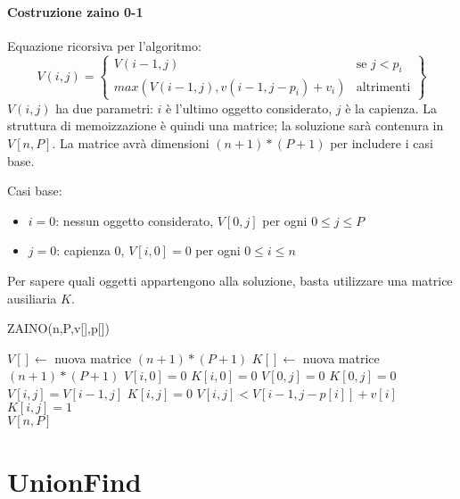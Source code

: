 \documentclass[11pt]{book}
\begin{document}
\subsubsection{Costruzione zaino 0-1}
Equazione ricorsiva per l'algoritmo:
\begin{equation*}
    V(i,j)=
    \left\{
        \begin{array}{lr}
            V(i-1,j)&\text{se } j<p_i\\
            max(V(i-1,j), v(i-1,j-p_i)+v_i)&\text{altrimenti}
        \end{array}
    \right\}
\end{equation*}
$V(i,j)$ ha due parametri: $i$ è l'ultimo oggetto considerato, $j$ è la capienza. La struttura di memoizzazione è quindi 
una matrice; la soluzione sarà contenura in $V[n,P]$. La matrice avrà dimensioni $(n+1)*(P+1)$ per includere i casi base. 

Casi base:
\begin{itemize}
    \item $i=0$: nessun oggetto considerato, $V[0,j]$ per ogni $0\leq j\leq P$
    \item $j=0$: capienza 0, $V[i,0]=0$ per ogni $0\leq i\leq n$
\end{itemize}
Per sapere quali oggetti appartengono alla soluzione, basta utilizzare una matrice ausiliaria $K$.
\begin{algorithm}
    \caption{ZAINO(n,P,v[],p[])}
    \begin{algorithmic}
        \State $V[]\gets$ nuova matrice $(n+1)*(P+1)$
        \State $K[]\gets$ nuova matrice $(n+1)*(P+1)$
            \State $V[i,0]=0$
            \State $K[i,0]=0$
        \EndFor
            \State $V[0,j]=0$
            \State $K[0,j]=0$
        \EndFor 
                \State $V[i,j]=V[i-1,j]$
                \State $K[i,j]=0$
                    \State $V[i,j]<V[i-1,j-p[i]]+v[i]$
                    \State $K[i,j]=1$
                \EndIf 
            \EndFor 
        \EndFor\\
        \Return $V[n,P]$
    \end{algorithmic}
\end{algorithm}
\chapter{UnionFind}
\end{document}
